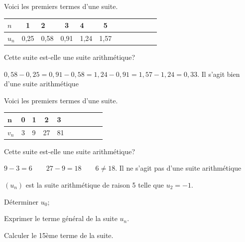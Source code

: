 \documentclass[11pt,a4paper]{article}  %
\begin{document}
\begin{enumMet}
	\item Voici les premiers termes d'une suite.
	
\begin{tabular}{|Xc|Xc|Xc|Xc|Xc|Xc|}
	\hline$n$ & 1 & 2 & 3 & 4 & 5 \\
	\hline$u_n$ & 0,25 & 0,58 & 0,91 & 1,24 & 1,57 \\
	\hline
\end{tabular}

Cette suite est-elle une suite arithmétique?

\begin{corrBox}
$0,58-0,25=0,91-0,58=1,24-0,91=1,57-1,24=0,33$. Il s'agit bien d'une suite arithmétique	
\end{corrBox}
%

\item Voici les premiers termes d'une suite.

\begin{tabular}{|Xc|Xc|Xc|Xc|Xc|}
	\hline $\boldsymbol{n}$ & 0 & 1 & 2 & 3 \\
	\hline$v_n$ & 3 & 9 & 27 & 81 \\
	\hline
\end{tabular}

Cette suite est-elle une suite arithmétique?
\begin{corrBox}
	$9-3=6 \quad \quad27-9=18  \quad \quad6\neq18$. Il ne s'agit pas d'une suite arithmétique	
\end{corrBox}
\end{enumMet}



$\left(u_n\right)$ est la suite arithmétique de raison 5 telle que $u_2=-1$.
\begin{enumMet}
	\item Déterminer $u_0$; 
	\item Exprimer le terme général de la suite $u_n$. 
	\item Calculer le 15ème terme de la suite. 
\end{enumMet}
\end{document}
